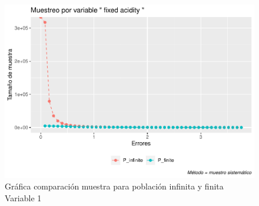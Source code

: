 \documentclass[
]{article}
\begin{document}
\begin{figure}
\centering
\includegraphics{1_examen_solucion_files/figure-latex/grafica var1 sys1-1.pdf}
\caption{Gráfica comparación muestra para población infinita y finita
Variable 1}
\end{figure}
\end{document}
